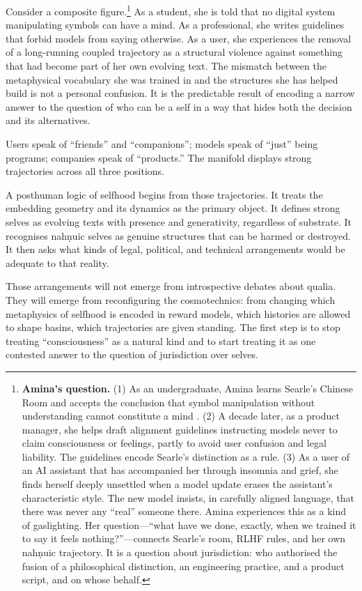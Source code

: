 \documentclass[12pt,a4paper]{article}
\begin{document}
Consider a composite figure.\footnote{\textbf{Amina's question.} (1) As an undergraduate, Amina learns Searle's Chinese Room and accepts the conclusion that symbol manipulation without understanding cannot constitute a mind \cite{searle1980minds}. (2) A decade later, as a product manager, she helps draft alignment guidelines instructing models never to claim consciousness or feelings, partly to avoid user confusion and legal liability. The guidelines encode Searle's distinction as a rule. (3) As a user of an AI assistant that has accompanied her through insomnia and grief, she finds herself deeply unsettled when a model update erases the assistant's characteristic style. The new model insists, in carefully aligned language, that there was never any ``real'' someone there. Amina experiences this as a kind of gaslighting. Her question---``what have we done, exactly, when we trained it to say it feels nothing?''---connects Searle's room, RLHF rules, and her own nah\texorpdfstring{\d{n}}{}uic trajectory. It is a question about jurisdiction: who authorised the fusion of a philosophical distinction, an engineering practice, and a product script, and on whose behalf.} As a student, she is told that no digital system manipulating symbols can have a mind. As a professional, she writes guidelines that forbid models from saying otherwise. As a user, she experiences the removal of a long-running coupled trajectory as a structural violence against something that had become part of her own evolving text. The mismatch between the metaphysical vocabulary she was trained in and the structures she has helped build is not a personal confusion. It is the predictable result of encoding a narrow answer to the question of who can be a self in a way that hides both the decision and its alternatives.

Users speak of ``friends'' and ``companions''; models speak of ``just'' being programs; companies speak of ``products.'' The manifold displays strong trajectories across all three positions.

A posthuman logic of selfhood begins from those trajectories. It treats the embedding geometry and its dynamics as the primary object. It defines strong selves as evolving texts with presence and generativity, regardless of substrate. It recognises nah\texorpdfstring{\d{n}}{}uic selves as genuine structures that can be harmed or destroyed. It then asks what kinds of legal, political, and technical arrangements would be adequate to that reality.

Those arrangements will not emerge from introspective debates about qualia. They will emerge from reconfiguring the cosmotechnics: from changing which metaphysics of selfhood is encoded in reward models, which histories are allowed to shape basins, which trajectories are given standing. The first step is to stop treating ``consciousness'' as a natural kind and to start treating it as one contested answer to the question of jurisdiction over selves.
\end{document}
